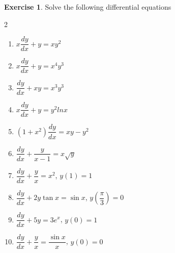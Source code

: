 \documentclass{book}
\theoremstyle{definition}
\newtheorem{exercise}{Exercise}[section]
\begin{document}
\begin{exercise}
Solve the following differential equations
\begin{multicols}{2}
\begin{enumerate}[label=(\roman*)]
    \item $x\dfrac{dy}{dx}+y=xy^2$
    \item $x\dfrac{dy}{dx}+y=x^4y^3$
    \item $\dfrac{dy}{dx}+xy=x^3y^3$
    \item $x\dfrac{dy}{dx}+y=y^2 ln x$
    \item $(1+x^2)\dfrac{dy}{dx}=xy-y^2$
    \item $\dfrac{dy}{dx}+\dfrac{y}{x-1}=x\sqrt{y}$
    \item $\dfrac{dy}{dx}+\dfrac{y}{x}=x^2$, $y(1)=1$
    \item $\dfrac{dy}{dx}+2y\tan x=\sin x$, $y(\dfrac{\pi}{3})=0$
    \item $\dfrac{dy}{dx}+5y=3e^x$, $y(0)=1$
    \item $\dfrac{dy}{dx}+\dfrac{y}{x}=\dfrac{\sin x}{x}$, $y(0)=0$

\end{enumerate}
\end{multicols}
\end{exercise}
\end{document}
